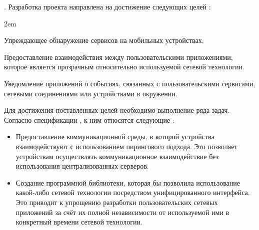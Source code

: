 .
\Sentence
Разработка проекта \PeerHood направлена на достижение следующих целей 
: 
\begin{description}
	\leftskip2em%
	\setlength{\itemsep}{0pt}%
	\setlength{\parsep}{0pt}%
	
	\item[Proactivity] Упреждающее обнаружение сервисов на мобильных устройствах.
	
	\item[Connectivity] Предоставление взаимодействия между пользовательскими приложениями, 
		которое является прозрачным относительно используемой сетевой технологии.
	
	\item[Reactivity] Уведомление приложений о событиях, связанных с пользовательскими сервисами, 
		сетевыми соединениями или устройствами в окружении.
\end{description}

\Sentence
Для достижения поставленных целей необходимо выполнение ряда задач.
\Sentence
Согласно спецификации \PeerHood, к ним относятся следующие :
\begin{itemize}
	\item Предоставление коммуникационной среды, в которой устройства взаимодействуют 
	с использованием пирингового подхода.
	\Sentence
	Это позволяет устройствам осуществлять коммуникационное взаимодействие без использования 
	централизованных серверов.
	
	\item Создание программной библиотеки, которая бы позволила использование какой-либо 
	сетевой технологии посредством унифицированного интерфейса.
	\Sentence
	Это приводит к упрощению разработки пользовательских сетевых приложений за 
	счёт их полной независимости от используемой ими в конкретный времени сетевой технологии.
\end{itemize}

